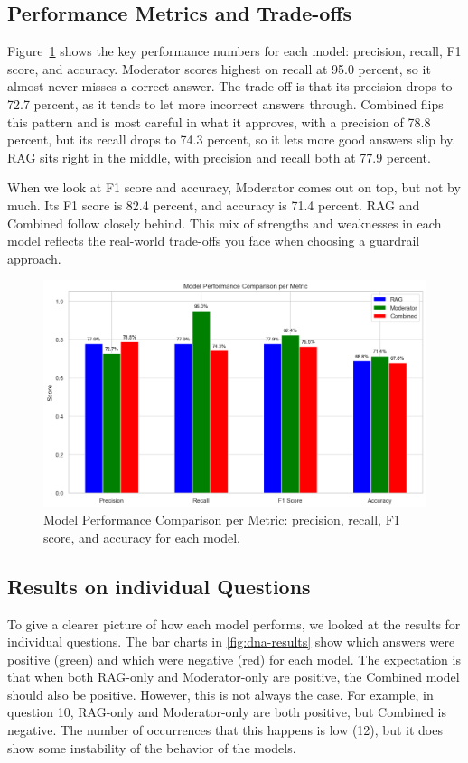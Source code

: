 \subsection{Performance Metrics and Trade-offs}

Figure~\ref{fig:model_performance_comparison_per_metric} shows the key performance numbers for each model: precision, recall, F1 score, and accuracy. Moderator scores highest on recall at 95.0 percent, so it almost never misses a correct answer. The trade-off is that its precision drops to 72.7 percent, as it tends to let more incorrect answers through. Combined flips this pattern and is most careful in what it approves, with a precision of 78.8 percent, but its recall drops to 74.3 percent, so it lets more good answers slip by. RAG sits right in the middle, with precision and recall both at 77.9 percent.

When we look at F1 score and accuracy, Moderator comes out on top, but not by much. Its F1 score is 82.4 percent, and accuracy is 71.4 percent. RAG and Combined follow closely behind. This mix of strengths and weaknesses in each model reflects the real-world trade-offs you face when choosing a guardrail approach.

\begin{figure}[ht]
  \centering
  \includegraphics[width=0.95\linewidth]{figures/model_performance comparison_per_metric.png}
  \caption{Model Performance Comparison per Metric: precision, recall, F1 score, and accuracy for each model.}
  \label{fig:model_performance_comparison_per_metric}
\end{figure}

\subsection{Results on individual Questions}
To give a clearer picture of how each model performs, we looked at the results for individual questions.
The bar charts in \autoref{fig:dna-results} show which answers were positive (green) and which were negative (red) for each model.
The expectation is that when both RAG-only and Moderator-only are positive, the Combined model should also be positive.
However, this is not always the case. For example, in question 10, RAG-only and Moderator-only are both positive, but Combined is negative.
The number of occurrences that this happens is low (12), but it does show some instability of the behavior of the models.

